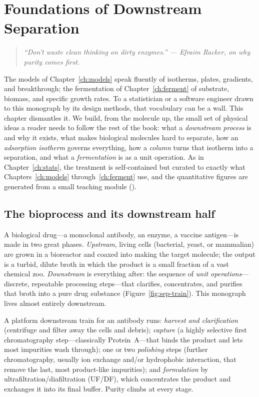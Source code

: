 \chapter{Foundations of Downstream Separation}
\label{ch:sep}

\begin{quote}\itshape
``Don't waste clean thinking on dirty enzymes.'' --- Efraim Racker, on why
purity comes first.
\end{quote}

\noindent
The models of Chapter~\ref{ch:models} speak fluently of isotherms, plates,
gradients, and breakthrough; the fermentation of Chapter~\ref{ch:ferment} of
substrate, biomass, and specific growth rates. To a statistician or a software
engineer drawn to this monograph by its design methods, that vocabulary can be a
wall. This chapter dismantles it. We build, from the molecule up, the small set
of physical ideas a reader needs to follow the rest of the book: what a
\emph{downstream process} is and why it exists, what makes biological molecules
hard to separate, how an \emph{adsorption isotherm} governs everything, how a
\emph{column} turns that isotherm into a separation, and what a
\emph{fermentation} is as a unit operation. As in Chapter~\ref{ch:stats}, the
treatment is self-contained but curated to exactly what Chapters~\ref{ch:models}
through~\ref{ch:ferment} use, and the quantitative figures are generated from a
small teaching module ().

\section{The bioprocess and its downstream half}
\label{sec:sep-train}

A biological drug---a monoclonal antibody, an enzyme, a vaccine antigen---is made
in two great phases. \emph{Upstream}, living cells (bacterial, yeast, or
mammalian) are grown in a bioreactor and coaxed into making the target molecule;
the output is a turbid, dilute broth in which the product is a small fraction of
a vast chemical zoo. \emph{Downstream} is everything after: the sequence of
\emph{unit operations}---discrete, repeatable processing steps---that clarifies,
concentrates, and purifies that broth into a pure drug substance
(Figure~\ref{fig:sep-train}). This monograph lives almost entirely downstream.

A platform downstream train for an antibody runs: \emph{harvest and
clarification} (centrifuge and filter away the cells and debris); \emph{capture}
(a highly selective first chromatography step---classically Protein~A---that binds
the product and lets most impurities wash through); one or two \emph{polishing}
steps (further chromatography, usually ion exchange and/or hydrophobic
interaction, that remove the last, most product-like impurities); and
\emph{formulation} by ultrafiltration/diafiltration (UF/DF), which concentrates
the product and exchanges it into its final buffer. Purity climbs at every
stage.

